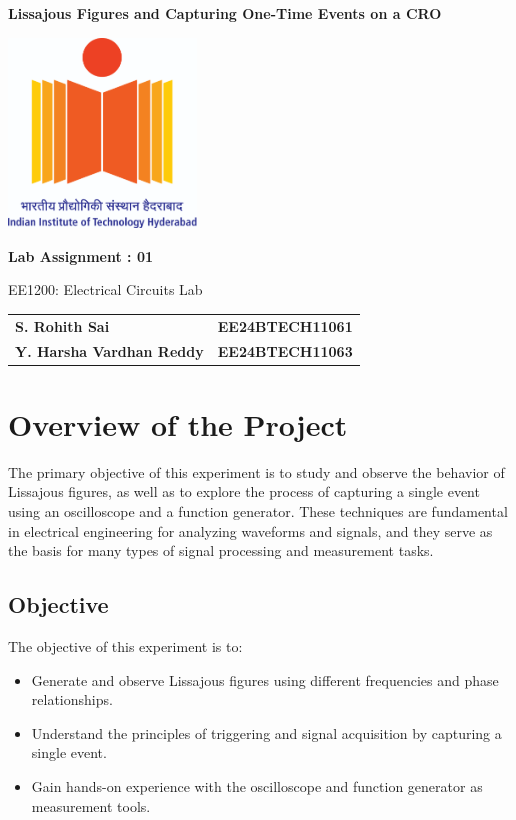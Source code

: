 \documentclass[12pt]{article}
\begin{document}
\begin{titlepage}
    \centering
    {\Huge \bfseries  Lissajous Figures and Capturing One-Time Events on a CRO

 \par}
    \vspace{1cm}
    \includegraphics[width=5cm]{figs/logo.jpg} %
    \vspace{1cm}
   
    {\Large \bfseries Lab Assignment : 01 \par}
    \vspace{0.5cm}
   
    {\large EE1200: Electrical Circuits Lab \par}
    \vspace{2cm}
   
\begin{tabular}{ll}
    \textbf{S. Rohith Sai} & \textbf{EE24BTECH11061} \\
    \textbf{Y. Harsha Vardhan Reddy} & \textbf{EE24BTECH11063} \\
\end{tabular}
\vspace{1cm}

\end{titlepage}
\newpage
\tableofcontents
\newpage
\section{Overview of the Project}

The primary objective of this experiment is to study and observe the behavior of Lissajous figures, as well as to explore the process of capturing a single event using an oscilloscope and a function generator. These techniques are fundamental in electrical engineering for analyzing waveforms and signals, and they serve as the basis for many types of signal processing and measurement tasks.

\subsection{Objective}
The objective of this experiment is to:
\begin{itemize}
    \item Generate and observe Lissajous figures using different frequencies and phase relationships.
    \item Understand the principles of triggering and signal acquisition by capturing a single event.
    \item Gain hands-on experience with the oscilloscope and function generator as measurement tools.
\end{itemize}
\end{document}
